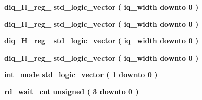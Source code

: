 \begin{DoxyCompactItemize}
\item 
{\bf diq\+\_\+\+H\+\_\+reg\+\_} {\bfseries \textcolor{comment}{std\+\_\+logic\+\_\+vector}\textcolor{vhdlchar}{ }\textcolor{vhdlchar}{(}\textcolor{vhdlchar}{ }\textcolor{vhdlchar}{ }\textcolor{vhdlchar}{ }\textcolor{vhdlchar}{ }{\bfseries {\bf iq\+\_\+width}} \textcolor{vhdlchar}{ }\textcolor{keywordflow}{downto}\textcolor{vhdlchar}{ }\textcolor{vhdlchar}{ } \textcolor{vhdldigit}{0} \textcolor{vhdlchar}{ }\textcolor{vhdlchar}{)}\textcolor{vhdlchar}{ }} 
\item 
{\bf diq\+\_\+\+H\+\_\+reg\+\_} {\bfseries \textcolor{comment}{std\+\_\+logic\+\_\+vector}\textcolor{vhdlchar}{ }\textcolor{vhdlchar}{(}\textcolor{vhdlchar}{ }\textcolor{vhdlchar}{ }\textcolor{vhdlchar}{ }\textcolor{vhdlchar}{ }{\bfseries {\bf iq\+\_\+width}} \textcolor{vhdlchar}{ }\textcolor{keywordflow}{downto}\textcolor{vhdlchar}{ }\textcolor{vhdlchar}{ } \textcolor{vhdldigit}{0} \textcolor{vhdlchar}{ }\textcolor{vhdlchar}{)}\textcolor{vhdlchar}{ }} 
\item 
{\bf diq\+\_\+\+H\+\_\+reg\+\_} {\bfseries \textcolor{comment}{std\+\_\+logic\+\_\+vector}\textcolor{vhdlchar}{ }\textcolor{vhdlchar}{(}\textcolor{vhdlchar}{ }\textcolor{vhdlchar}{ }\textcolor{vhdlchar}{ }\textcolor{vhdlchar}{ }{\bfseries {\bf iq\+\_\+width}} \textcolor{vhdlchar}{ }\textcolor{keywordflow}{downto}\textcolor{vhdlchar}{ }\textcolor{vhdlchar}{ } \textcolor{vhdldigit}{0} \textcolor{vhdlchar}{ }\textcolor{vhdlchar}{)}\textcolor{vhdlchar}{ }} 
\item 
{\bf diq\+\_\+\+H\+\_\+reg\+\_} {\bfseries \textcolor{comment}{std\+\_\+logic\+\_\+vector}\textcolor{vhdlchar}{ }\textcolor{vhdlchar}{(}\textcolor{vhdlchar}{ }\textcolor{vhdlchar}{ }\textcolor{vhdlchar}{ }\textcolor{vhdlchar}{ }{\bfseries {\bf iq\+\_\+width}} \textcolor{vhdlchar}{ }\textcolor{keywordflow}{downto}\textcolor{vhdlchar}{ }\textcolor{vhdlchar}{ } \textcolor{vhdldigit}{0} \textcolor{vhdlchar}{ }\textcolor{vhdlchar}{)}\textcolor{vhdlchar}{ }} 
\item 
{\bf int\+\_\+mode} {\bfseries \textcolor{comment}{std\+\_\+logic\+\_\+vector}\textcolor{vhdlchar}{ }\textcolor{vhdlchar}{(}\textcolor{vhdlchar}{ }\textcolor{vhdlchar}{ } \textcolor{vhdldigit}{1} \textcolor{vhdlchar}{ }\textcolor{keywordflow}{downto}\textcolor{vhdlchar}{ }\textcolor{vhdlchar}{ } \textcolor{vhdldigit}{0} \textcolor{vhdlchar}{ }\textcolor{vhdlchar}{)}\textcolor{vhdlchar}{ }} 
\item 
{\bf rd\+\_\+wait\+\_\+cnt} {\bfseries \textcolor{comment}{unsigned}\textcolor{vhdlchar}{ }\textcolor{vhdlchar}{(}\textcolor{vhdlchar}{ }\textcolor{vhdlchar}{ } \textcolor{vhdldigit}{3} \textcolor{vhdlchar}{ }\textcolor{keywordflow}{downto}\textcolor{vhdlchar}{ }\textcolor{vhdlchar}{ } \textcolor{vhdldigit}{0} \textcolor{vhdlchar}{ }\textcolor{vhdlchar}{)}\textcolor{vhdlchar}{ }} 

\end{DoxyCompactItemize}
